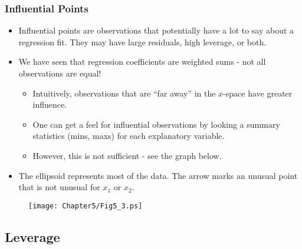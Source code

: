 \begin{frame}[shrink=2]
 \frametitle{Influential Points}
 \begin{itemize}
 \item Influential points are observations that potentially have a lot to say about a regression fit.
 They may have large residuals, high leverage, or both.
 \item We have seen that regression coefficients are weighted sums -
 not all observations are equal!
  \begin{itemize}
 \item Intuitively, observations that are ``far away'' in the
 $x$-space have greater influence.
 \item One can get a feel for influential observations by looking a
 summary statistics (mins, maxs) for each explanatory variable.
 \item However, this is not sufficient - see the graph below.
     \end{itemize}
   \item The ellipsoid
represents most of the data. The arrow marks an unusual point that
is not unusual for $x_1$ or $x_2$.
    \end{itemize}
\begin{figure}[htp]
  \begin{center}
    \texttt{[image: Chapter5/Fig5\_3.ps]}
  \end{center}
\end{figure}
\end{frame}

\subsection{Leverage}


